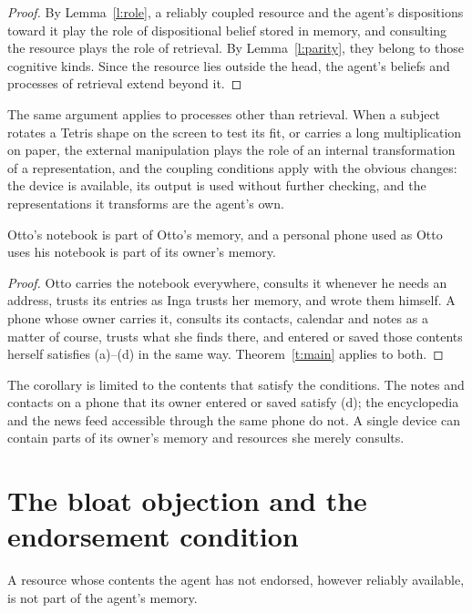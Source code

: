 \documentclass{situationist-preprint}
\begin{document}
\begin{proof}
By Lemma~\ref{l:role}, a reliably coupled resource and the agent's dispositions toward it play the role of dispositional belief stored in memory, and consulting the resource plays the role of retrieval. By Lemma~\ref{l:parity}, they belong to those cognitive kinds. Since the resource lies outside the head, the agent's beliefs and processes of retrieval extend beyond it.
\end{proof}

The same argument applies to processes other than retrieval. When a subject rotates a Tetris shape on the screen to test its fit, or carries a long multiplication on paper, the external manipulation plays the role of an internal transformation of a representation, and the coupling conditions apply with the obvious changes: the device is available, its output is used without further checking, and the representations it transforms are the agent's own.

\begin{corollary}\label{c:cases}
Otto's notebook is part of Otto's memory, and a personal phone used as Otto uses his notebook is part of its owner's memory.
\end{corollary}

\begin{proof}
Otto carries the notebook everywhere, consults it whenever he needs an address, trusts its entries as Inga trusts her memory, and wrote them himself. A phone whose owner carries it, consults its contacts, calendar and notes as a matter of course, trusts what she finds there, and entered or saved those contents herself satisfies (a)--(d) in the same way. Theorem~\ref{t:main} applies to both.
\end{proof}

The corollary is limited to the contents that satisfy the conditions. The notes and contacts on a phone that its owner entered or saved satisfy (d); the encyclopedia and the news feed accessible through the same phone do not. A single device can contain parts of its owner's memory and resources she merely consults.

\section{The bloat objection and the endorsement condition}

\begin{proposition}\label{p:nobloat}
A resource whose contents the agent has not endorsed, however reliably available, is not part of the agent's memory.
\end{proposition}
\end{document}
